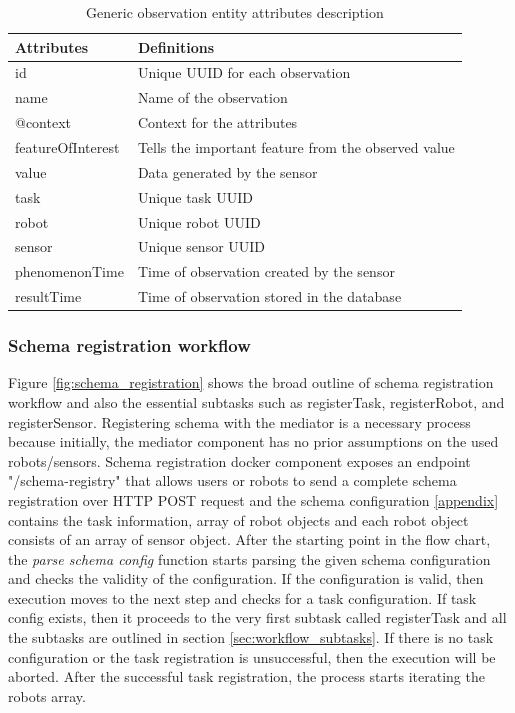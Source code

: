 	\begin{table}[!htbp]
		\begin{tabular}{|l|p{12cm}|}
			\hline
			\textbf{Attributes} & \textbf{Definitions} \\ \hline
			
				id & Unique UUID for each observation \\ \hline
				name & Name of the observation \\ \hline
				@context & Context for the attributes \\ \hline
				featureOfInterest & Tells the important feature from the observed value \\ \hline
				value & Data generated by the sensor \\ \hline
				task & Unique task UUID \\ \hline
				robot & Unique robot UUID \\ \hline
				sensor & Unique sensor UUID \\ \hline
				phenomenonTime & Time of observation created by the sensor \\ \hline
				resultTime & Time of observation stored in the database \\ \hline
			
		\end{tabular}
		\caption{Generic observation entity attributes description}
		\label{tab:observation}
	\end{table}

	\subsubsection{Schema registration workflow}
	Figure \ref{fig:schema_registration} shows the broad outline of schema registration workflow and also the essential subtasks such as registerTask,  registerRobot, and registerSensor. Registering schema with the mediator is a necessary process because initially, the mediator component has no prior assumptions on the used robots/sensors. Schema registration docker component exposes an endpoint "/schema-registry" that allows users or robots to send a complete schema registration over HTTP POST request and the schema configuration \ref{appendix} contains the task information, array of robot objects and each robot object consists of an array of sensor object. After the starting point in the flow chart, the \emph{parse schema config} function starts parsing the given schema configuration and checks the validity of the configuration. If the configuration is valid, then execution moves to the next step and checks for a task configuration. If task config exists, then it proceeds to the very first subtask called registerTask and all the subtasks are outlined in section \ref{sec:workflow_subtasks}. If there is no task configuration or the task registration is unsuccessful, then the execution will be aborted.  After the successful task registration, the process starts iterating the robots array. 
	

